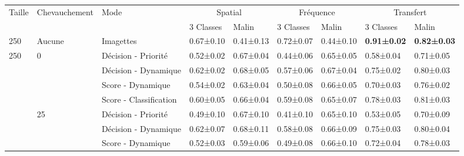 \begin{landscape}
\begin{table}[]
    \centering
    \begin{tabular}{lllllllll}
		\toprule
		\multirow{2}{*}{Taille}     & \multirow{2}{*}{Chevauchement}    & \multirow{2}{*}{Mode}     & \multicolumn{2}{c}{Spatial}       & \multicolumn{2}{c}{Fréquence}     & \multicolumn{2}{c}{Transfert}         \\
		                            &                                   &                           & 3 Classes         & Malin         & 3 Classes         & Malin         & 3 Classes         & Malin             \\ \midrule
		250                         & Aucune                            & Imagettes                 & 0.67±0.10         & 0.41±0.13     & 0.72±0.07         & 0.44±0.10     & \textbf{0.91±0.02}& \textbf{0.82±0.03}\\ \midrule
		\multirow{12}{*}{250}       & \multirow{4}{*}{0}                & Décision - Priorité                    & 0.52±0.02         & 0.67±0.04     & 0.44±0.06         & 0.65±0.05     & 0.58±0.04         & 0.71±0.05         \\ 
							        &                                   & Décision - Dynamique                    & 0.62±0.02         & 0.68±0.05     & 0.57±0.06         & 0.67±0.04     & 0.75±0.02         & 0.80±0.03         \\
							        &                                   & Score - Dynamique               & 0.54±0.02         & 0.63±0.04     & 0.50±0.08         & 0.66±0.05     & 0.70±0.03         & 0.76±0.02         \\
							        &                                   & Score - Classification                    & 0.60±0.05         & 0.66±0.04     & 0.59±0.08         & 0.65±0.07     & 0.78±0.03         & 0.81±0.03         \\ \cline{2-9}
							        & \multirow{4}{*}{25}               & Décision - Priorité                    & 0.49±0.10         & 0.67±0.10     & 0.41±0.10         & 0.65±0.10     & 0.53±0.05         & 0.70±0.09         \\
							        &                                   & Décision - Dynamique                    & 0.62±0.07         & 0.68±0.11     & 0.58±0.08         & 0.66±0.09     & 0.75±0.03         & 0.80±0.04         \\
							        &                                   & Score - Dynamique               & 0.52±0.03         & 0.59±0.06     & 0.49±0.08         & 0.66±0.10     & 0.72±0.04         & 0.78±0.03         \\

\end{tabular}
\end{table}
\end{landscape}
